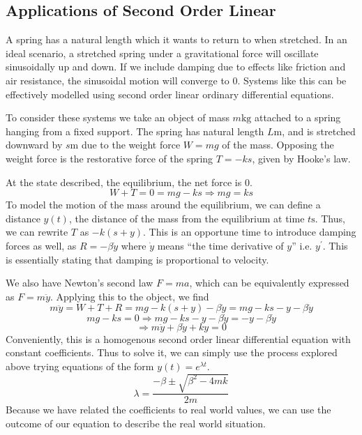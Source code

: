 \documentclass[12pt]{report}
\begin{document}
\begin{flushleft}
\subsection*{Applications of Second Order Linear}

A spring has a natural length which it wants to return to when stretched. In an
ideal scenario, a stretched spring under a gravitational force will oscillate
sinusoidally up and down. If we include damping due to effects like friction
and air resistance, the sinusoidal motion will converge to \(0\). Systems like
this can be effectively modelled using second order linear ordinary
differential equations. \par
To consider these systems we take an object of mass \(m\mathrm{kg}\) attached
to a spring hanging from a fixed support. The spring has natural length
\(L\mathrm{m}\), and is stretched downward by \(s\mathrm{m}\) due to the weight
force \(W = mg\) of the mass. Opposing the weight force is the restorative
force of the spring \(T = -ks\), given by Hooke's law. \par
At the state described, the equilibrium, the net force is \(0\).
\[W + T = 0 = mg - ks \Rightarrow mg = ks\]
To model the motion of the mass around the equilibrium, we can define a
distance \(y(t)\), the distance of the mass from the equilibrium at time
\(t\mathrm{s}\). Thus, we can rewrite \(T\) as \(-k(s + y)\). This is an
opportune time to introduce damping forces as well, as \(R = -\beta \dot{y}\)
where \(\dot{y}\) means ``the time derivative of \(y\)'' i.e. \(y^\prime\).
This is essentially stating that damping is proportional to velocity. \par
We also have Newton's second law \(F = ma\), which can be equivalently
expressed as \(F = m\ddot{y}\). Applying this to the object, we find
\[m\ddot{y} = W + T + R = mg - k(s + y) - \beta\dot{y}
= mg - ks - y - \beta \dot{y}\]
\[mg - ks = 0 \Rightarrow mg - ks - y - \beta \dot{y} = -y - \beta \dot{y}\]
\[\Rightarrow m\ddot{y} + \beta\dot{y} + ky = 0\]
Conveniently, this is a homogenous second order linear differential equation
with constant coefficients. Thus to solve it, we can simply use the process
explored above trying equations of the form \(y(t) = e^{\lambda t}\).
\[\lambda = \frac{-\beta \pm \sqrt{\beta^2 -4mk}}{2m}\]
Because we have related the coefficients to real world values, we can use the
outcome of our equation to describe the real world situation.


\end{flushleft}
\end{document}
